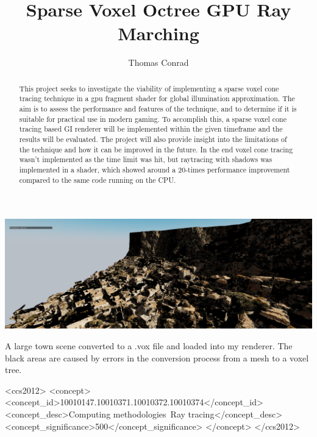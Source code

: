 \documentclass[sigconf,nonacm]{acmart}
\begin{document}
	\title{Sparse Voxel Octree GPU Ray Marching}
	
	\author{Thomas Conrad}
	
	
	\begin{teaserfigure}
		\includegraphics[width=\textwidth]{town}
		\caption{A large town scene \cite{monemvasia_town_scene_nodate} converted to a .vox file and loaded into my renderer. The black areas are caused by errors in the conversion process from a mesh to a voxel tree.}
		\label{fig:town}
	\end{teaserfigure}
	
	\begin{abstract}
		This project seeks to investigate the viability of implementing a sparse voxel cone tracing technique in a gpu fragment shader for global illumination approximation. The aim is to assess the performance and features of the technique, and to determine if it is suitable for practical use in modern gaming. To accomplish this, a sparse voxel cone tracing based GI renderer will be implemented within the given timeframe and the results will be evaluated. The project will also provide insight into the limitations of the technique and how it can be improved in the future. In the end voxel cone tracing wasn't implemented as the time limit was hit, but raytracing with shadows was implemented in a shader, which showed around a 20-times performance improvement compared to the same code running on the CPU.
	\end{abstract}
	
	\begin{CCSXML}
		<ccs2012>
		<concept>
		<concept_id>10010147.10010371.10010372.10010374</concept_id>
		<concept_desc>Computing methodologies~Ray tracing</concept_desc>
		<concept_significance>500</concept_significance>
		</concept>
		</ccs2012>
	\end{CCSXML}
	
	
	
	

	\maketitle
	
	
	
	
	
	
	
\end{document}
